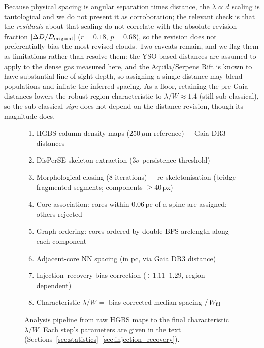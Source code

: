 \documentclass[usenatbib,twoside,twocolumn]{mnras}
\begin{document}
Because physical spacing is angular separation times distance, the $\lambda\propto d$ scaling is tautological and we do not present it as corroboration; the relevant check is that the \emph{residuals} about that scaling do not correlate with the absolute revision fraction $|\Delta D/D_{\rm original}|$ ($r=0.18$, $p=0.68$), so the revision does not preferentially bias the most-revised clouds. Two caveats remain, and we flag them as limitations rather than resolve them: the YSO-based distances \citep{Zhang2023} are assumed to apply to the dense gas measured here, and the Aquila/Serpens Rift is known to have substantial line-of-sight depth, so assigning a single distance may blend populations and inflate the inferred spacing. As a floor, retaining the pre-Gaia distances lowers the robust-region characteristic to $\lambda/W\approx1.4$ (still sub-classical), so the sub-classical \emph{sign} does not depend on the distance revision, though its magnitude does.

\begin{figure}
\centering
\begin{minipage}{0.95\columnwidth}
\footnotesize
\begin{enumerate}\setlength{\itemsep}{2pt}
\item HGBS column-density maps ($250\,\mu$m reference) + Gaia DR3 distances
\item DisPerSE skeleton extraction ($3\sigma$ persistence threshold)
\item Morphological closing (8 iterations) $+$ re-skeletonisation (bridge fragmented segments; components $\geq40$\,px)
\item Core association: cores within $0.06$\,pc of a spine are assigned; others rejected
\item Graph ordering: cores ordered by double-BFS arclength along each component
\item Adjacent-core NN spacing (in pc, via Gaia DR3 distance)
\item Injection--recovery bias correction ($\div\,1.11$--$1.29$, region-dependent)
\item Characteristic $\lambda/W = $ bias-corrected median spacing $/\,W_{\rm fil}$
\end{enumerate}
\end{minipage}
\caption{Analysis pipeline from raw HGBS maps to the final characteristic $\lambda/W$. Each step's parameters are given in the text (Sections~\ref{sec:statistics}--\ref{sec:injection_recovery}).}
\label{fig:pipeline}
\end{figure}
\end{document}
